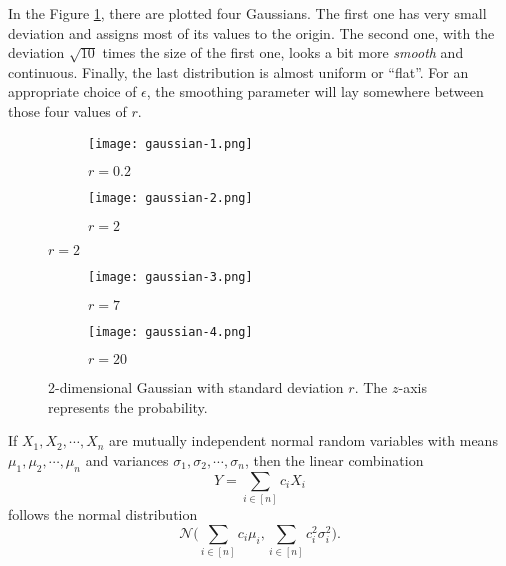 In the Figure \ref{smoothing-1}, there are plotted four Gaussians. The first one has very small deviation and assigns most of its values to the origin. The second one, with the deviation $\sqrt{10}$ times the size of the first one, looks a bit more \textit{smooth} and continuous. Finally, the last distribution is almost uniform or ``flat''. For an appropriate choice of $\epsilon$, the smoothing parameter will lay somewhere between those four values of $r$.

\begin{figure}[ht]
        \centering
                \begin{subfigure}{.5\linewidth} 
                \centering
                \texttt{[image: gaussian-1.png]}
                \caption{$r = 0.2$}
        \end{subfigure}%
        \begin{subfigure}{.5\linewidth}
                \centering
                \texttt{[image: gaussian-2.png]}
                \caption{$r = 2$}
        \end{subfigure}
\end{figure}

\begin{figure}[h]
        \centering
                \begin{subfigure}{.5\linewidth} 
                \centering
                \texttt{[image: gaussian-3.png]}
                \caption{$r = 7$}
        \end{subfigure}%
        \begin{subfigure}{.5\linewidth}
                \centering
                \texttt{[image: gaussian-4.png]}
                \caption{$r = 20$}
        \end{subfigure}
        \caption{2-dimensional Gaussian with standard deviation $r$. The $z$-axis represents the probability.}
        \label{smoothing-1}
\end{figure}
\begin{proposition}\label{gauss_sum}
If $X_1, X_2, \cdots, X_n$ are mutually independent normal random variables with means $\mu_1, \mu_2, \cdots, \mu_n$ and variances $\sigma_1, \sigma_2, \cdots, \sigma_n$, then the linear combination
\[ Y = \sum_{i \in [n]} c_i X_i \]
follows the normal distribution
\[ \mathcal{N}\biggl(\sum_{i \in [n]} c_i \mu_i, \sum_{i \in [n]} c^2_i \sigma^2_i\biggr). \]
\end{proposition}
